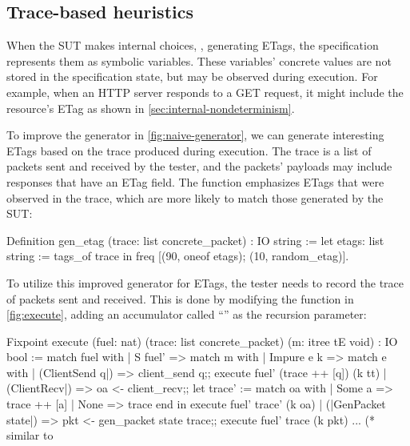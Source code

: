 \subsection{Trace-based heuristics}
\label{sec:heuristic-trace}

When the SUT makes internal choices, \eg, generating ETags, the
specification represents them as symbolic variables.  These variables' concrete
values are not stored in the specification state, but may be observed during
execution.  For example, when an HTTP server responds to a GET request, it might
include the resource's ETag as shown in \autoref{sec:internal-nondeterminism}.

To improve the generator in \autoref{fig:naive-generator}, we can generate
interesting ETags based on the trace produced during execution.  The trace is a
list of packets sent and received by the tester, and the packets' payloads may
include responses that have an ETag field.  The  function
emphasizes ETags that were observed in the trace, which are more likely to match
those generated by the SUT:
\begin{coq}
  Definition gen_etag (trace: list concrete_packet) : IO string :=
    let etags: list string := tags_of trace in
    freq [(90, oneof etags);
          (10, random_etag)].
\end{coq}

To utilize this improved generator for ETags, the tester needs to record the
trace of packets sent and received.  This is done by modifying the 
function in \autoref{fig:execute}, adding an accumulator called ``''
as the recursion parameter:
\begin{coq}
  Fixpoint execute (fuel: nat) (trace: list concrete_packet)
                   (m: itree tE void) : IO bool :=
    match fuel with
    | S fuel' =>
      match m with
      | Impure e k =>
        match e with
        | (ClientSend q|) => client_send q;;
                             execute fuel' (trace ++ [q]) (k tt)
        | (ClientRecv|)   => oa <- client_recv;;                             
                             let trace' := match oa with
                                           | Some a => trace ++ [a]
                                           | None   => trace
                                           end in
                             execute fuel' trace' (k oa)
        | (|GenPacket state|) => pkt <- gen_packet state trace;;
                                 execute fuel' trace (k pkt)
        ... (* similar to %
\end{coq}

